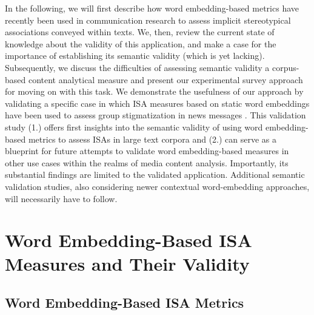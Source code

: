In the following, we will first describe how word embedding-based metrics have recently been used in communication research to assess implicit stereotypical associations conveyed within texts. We, then, review the current state of knowledge about the validity of this application, and make a case for the importance of establishing its semantic validity (which is yet lacking). Subsequently, we discuss the difficulties of assessing semantic validity  a corpus- based content analytical measure and present our experimental survey approach for moving on with this task. We demonstrate the usefulness of our approach by validating a specific case in which ISA measures based on static word embeddings have been used to assess group stigmatization in news messages \parencite{mueller:2023:DRN}. This validation study (1.) offers first insights into the semantic validity of using word embedding-based metrics to assess ISAs in large text corpora and (2.) can serve as a blueprint for future attempts to validate word embedding-based measures in other use cases within the realms of media content analysis. Importantly, its substantial findings are limited to the validated application. Additional semantic validation studies, also considering newer contextual word-embedding approaches, will necessarily have to follow.

\section{Word Embedding-Based ISA Measures and Their Validity}

\subsection{Word Embedding-Based ISA Metrics}

